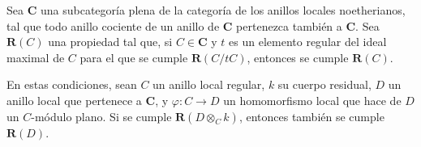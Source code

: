
\begin{lemma}[7.5.1.1]
\label{IV.2.s7.5.1.1-fr}
Sea $\boldsymbol{C}$ una subcategoría plena de la categoría de los anillos
locales noetherianos, tal que todo anillo cociente de un anillo de
$\boldsymbol{C}$ pertenezca también a $\boldsymbol{C}$. Sea $\boldsymbol R(C)$
una propiedad tal que, si $C\in\boldsymbol{C}$ y $t$ es un elemento regular
del ideal maximal de $C$ para el que se cumple $\boldsymbol R(C/tC)$,
entonces se cumple $\boldsymbol R(C)$.

En estas condiciones, sean $C$ un anillo local regular, $k$ su cuerpo
residual, $D$ un anillo local que pertenece a $\boldsymbol{C}$, y
$\varphi:C\to D$ un homomorfismo local que hace de $D$ un $C$-módulo
plano. Si se cumple $\boldsymbol R(D\otimes_C k)$, entonces también
se cumple $\boldsymbol R(D)$.
\end{lemma}
